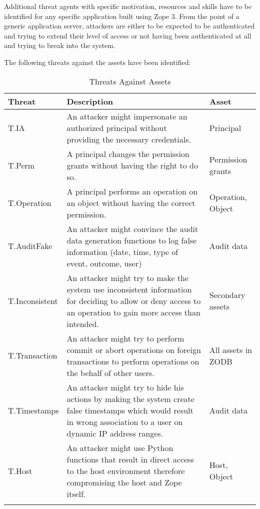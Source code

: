 \documentclass[12pt,english]{scrbook}
\begin{document}
Additional threat agents with specific motivation, resources and skills have to
be identified for any specific application built using Zope 3. From the point
of a generic application server, attackers are either to be expected to  be
authenticated and trying to extend their level of access or not having been
authenticated at all and trying to break into the system.

The following threats against the assets have been identified:

\begin{longtable}[c]{lp{6cm}p{4cm}}
  \toprule
  Threat & Description & Asset\\
  \midrule\endhead

  T.IA
   & 
  An attacker might impersonate an authorized
  principal without providing the necessary
  credentials.
   & 
  Principal
   \\
  

  T.Perm
   & 
  A principal changes the permission grants
  without having the right to do so.
   & 
  Permission grants
   \\
  

  T.Operation
   & 
  A principal performs an operation on an object
  without having the correct permission.
   & 
  Operation, Object
   \\
  

  T.AuditFake
   & 
  An attacker might convince the audit data
  generation functions to log false information
  (date, time, type of event, outcome, user)
   & 
  Audit data
   \\
  

  T.Inconsistent
   & 
  An attacker might try to make the system use
  inconsistent information for deciding to allow
  or deny access to an operation to gain more
  access than intended.
   & 
  Secondary assets
   \\
  

  T.Transaction
   & 
  An attacker might try to perform commit or
  abort operations on foreign transactions to
  perform operations on the behalf of other
  users.
   & 
  All assets in ZODB
   \\
  
  T.Timestamps
   & 
  An attacker might try to hide his actions
  by making the system create false timestamps
  which would result in wrong association to a
  user on dynamic IP address ranges.
   & 
  Audit data
   \\
  

  T.Host
   & 
  An attacker might use Python functions that
  result in direct access to the host environment
  therefore compromising the host and Zope itself.
   & 
  Host, Object
  \\
  \bottomrule
\caption{Threats Against Assets}
\label{tab-threats}
\end{longtable}
  
\end{document}
